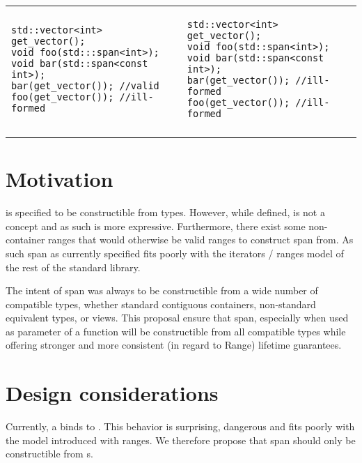 \documentclass{wg21}
\begin{document}
\begin{center}
\begin{tabular}{l|l}
\begin{minipage}[t]{0.5\textwidth}
\begin{verbatim}
std::vector<int> get_vector();
void foo(std:::span<int>);
void bar(std::span<const int>);
bar(get_vector()); //valid
foo(get_vector()); //ill-formed
\end{verbatim}
\end{minipage}
&
\begin{minipage}[t]{0.5\textwidth}
\begin{verbatim}
std::vector<int> get_vector();
void foo(std::span<int>);
void bar(std::span<const int>);
bar(get_vector()); //ill-formed
foo(get_vector()); //ill-formed
\end{verbatim}
\end{minipage}
\\\\ \hline
\end{tabular}
\end{center}


\section{Motivation}

 is specified to be constructible from  types.
However, while defined,  is not a concept and as such  is more expressive.
Furthermore, there exist some non-container ranges that would otherwise be valid ranges to construct span from.
As such span as currently specified fits poorly with the iterators / ranges model of the rest of the standard library.

The intent of span was always to be constructible from a wide number of compatible types, 
whether standard contiguous containers, non-standard equivalent types, or views.
This proposal ensure that span, especially when used as parameter of a function will be constructible 
from all compatible types while offering stronger and more consistent (in regard to Range) lifetime guarantees.


\section{Design considerations}

Currently, a  binds to .
This behavior is surprising, dangerous and fits poorly with the  model introduced with ranges.
We therefore propose that span should only be constructible from s.
\end{document}
